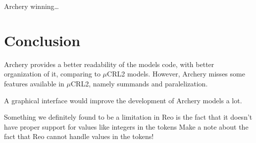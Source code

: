 \documentclass[a4paper]{article}
\newcommand{\ar}{Archery\xspace}
\newcommand{\re}{Reo\xspace}
\newcommand{\mcrl}{$\mu$CRL2\xspace}
\begin{document}
\ar winning\dots

%
%
\section{Conclusion}
\ar provides a better readability of the models code, with better organization
of it, comparing to \mcrl models. However, \ar misses some features available in
\mcrl, namely summands and paralelization.

A graphical interface would improve the development of Archery models a lot.



Something we definitely found to be a limitation in \re is the fact that it
doesn't have proper support for values like integers in the tokens
Make a note about the fact that \re cannot handle values in the tokens! %
\end{document}
